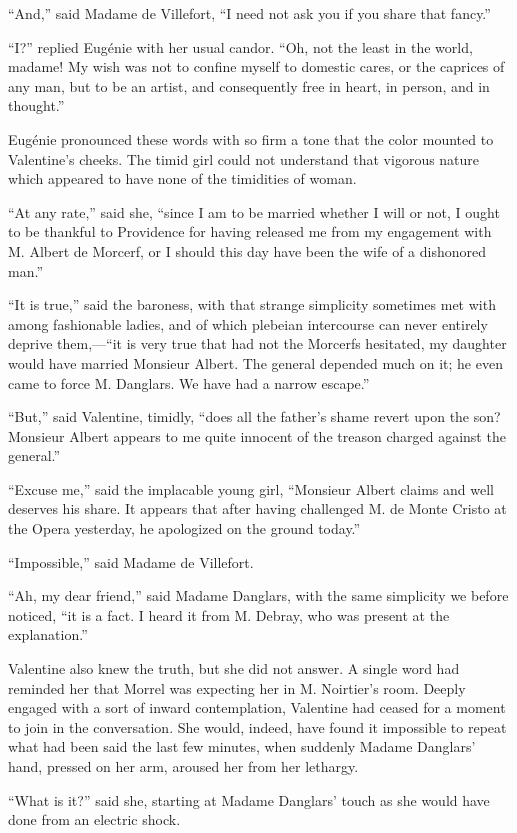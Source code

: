 “And,” said Madame de Villefort, “I need not ask you if you share that
fancy.”

“I?” replied Eugénie with her usual candor. “Oh, not the least in the
world, madame! My wish was not to confine myself to domestic cares, or
the caprices of any man, but to be an artist, and consequently free in
heart, in person, and in thought.”

Eugénie pronounced these words with so firm a tone that the color
mounted to Valentine’s cheeks. The timid girl could not understand that
vigorous nature which appeared to have none of the timidities of woman.

“At any rate,” said she, “since I am to be married whether I will or
not, I ought to be thankful to Providence for having released me from
my engagement with M. Albert de Morcerf, or I should this day have been
the wife of a dishonored man.”

“It is true,” said the baroness, with that strange simplicity sometimes
met with among fashionable ladies, and of which plebeian intercourse
can never entirely deprive them,—“it is very true that had not the
Morcerfs hesitated, my daughter would have married Monsieur Albert. The
general depended much on it; he even came to force M. Danglars. We have
had a narrow escape.”

“But,” said Valentine, timidly, “does all the father’s shame revert
upon the son? Monsieur Albert appears to me quite innocent of the
treason charged against the general.”

“Excuse me,” said the implacable young girl, “Monsieur Albert claims
and well deserves his share. It appears that after having challenged M.
de Monte Cristo at the Opera yesterday, he apologized on the ground
today.”

“Impossible,” said Madame de Villefort.

“Ah, my dear friend,” said Madame Danglars, with the same simplicity we
before noticed, “it is a fact. I heard it from M. Debray, who was
present at the explanation.”

Valentine also knew the truth, but she did not answer. A single word
had reminded her that Morrel was expecting her in M. Noirtier’s room.
Deeply engaged with a sort of inward contemplation, Valentine had
ceased for a moment to join in the conversation. She would, indeed,
have found it impossible to repeat what had been said the last few
minutes, when suddenly Madame Danglars’ hand, pressed on her arm,
aroused her from her lethargy.

“What is it?” said she, starting at Madame Danglars’ touch as she would
have done from an electric shock.


